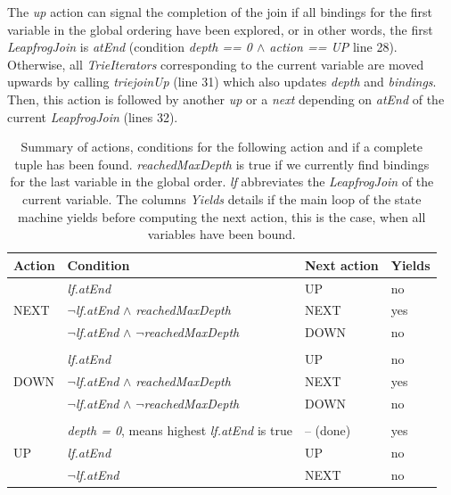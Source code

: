 The \textit{up} action can signal the completion of the join if all bindings for the first variable in the global ordering have
been explored, or in other words, the first \textit{LeapfrogJoin} is \textit{atEnd} (condition
\textit{depth == 0 $\wedge$ action ==  UP} line 28). %
Otherwise, all \textit{TrieIterators} corresponding to the current variable are moved upwards by calling \textit{triejoinUp} (line 31)
which also updates \textit{depth} and \textit{bindings}.  %
Then, this action is followed by another \textit{up} or a \textit{next} depending on \textit{atEnd} of the current \textit{LeapfrogJoin}
(lines 32). %

\begin{table}[]
    \centering
    \begin{tabular}{@{}llll@{}}
        \toprule
        Action                & Condition                                  & Next action & Yields \\ \midrule
        \multirow{3}{*}{NEXT} & \textit{lf.atEnd}                                   & UP          & no     \\
        & \textit{$\neg$lf.atEnd} $\wedge$ \textit{reachedMaxDepth}             & NEXT        & yes    \\
        & \textit{$\neg$lf.atEnd} $\wedge$ \textit{$\neg$reachedMaxDepth}            & DOWN        & no     \\
        & & &\\
        \multirow{3}{*}{DOWN} & \textit{lf.atEnd}                                   & UP          & no     \\
        & \textit{$\neg$lf.atEnd} $\wedge$ \textit{reachedMaxDepth}             & NEXT        & yes    \\
        & \textit{$\neg$lf.atEnd} $\wedge$ \textit{$\neg$reachedMaxDepth}            & DOWN        & no     \\
        & & &\\
        \multirow{3}{*}{UP}     & \textit{depth = 0}, means highest \textit{lf.atEnd} is true & -- (done)         & yes    \\
        & \textit{lf.atEnd}                                   & UP          & no     \\
        & \textit{$\neg$lf.atEnd}                                  & NEXT        & no     \\ \bottomrule
    \end{tabular}
    \caption{Summary of actions, conditions for the following action and if a complete tuple has been found.
    \textit{reachedMaxDepth} is true if we currently find bindings for the last variable in the global order.
    \textit{lf} abbreviates the \textit{LeapfrogJoin} of the current variable.
    The columns \textit{Yields} details if the main loop of the state machine yields before computing the next action,
    this is the case, when all variables have been bound.
    }
    \label{table:lftj-state-machine}
\end{table}

